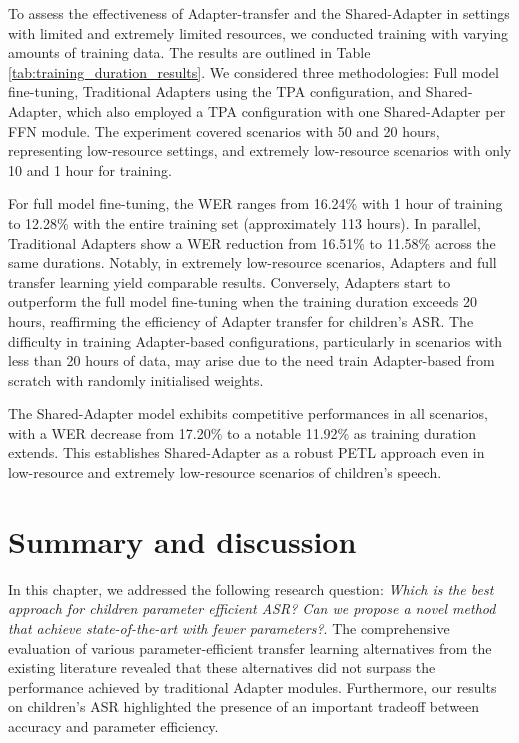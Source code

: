 To assess the effectiveness of Adapter-transfer and the Shared-Adapter in settings with limited and extremely limited resources, we conducted training with varying amounts of training data. The results are outlined in Table \ref{tab:training_duration_results}. We considered three methodologies: Full model fine-tuning, Traditional Adapters using the \ac{TPA} configuration, and Shared-Adapter, which also employed a \ac{TPA} configuration with one Shared-Adapter per \ac{FFN} module. The experiment covered scenarios with 50 and 20 hours, representing low-resource settings, and extremely low-resource scenarios with only 10 and 1 hour for training.

For full model fine-tuning, the \ac{WER} ranges from 16.24\% with 1 hour of training to 12.28\% with the entire training set (approximately 113 hours). In parallel, Traditional Adapters show a \ac{WER} reduction from 16.51\% to 11.58\% across the same durations. Notably, in extremely low-resource scenarios, Adapters and full transfer learning yield comparable results. Conversely, Adapters start to outperform the full model fine-tuning when the training duration exceeds 20 hours, reaffirming the efficiency of Adapter transfer for children's \ac{ASR}. The difficulty in training Adapter-based configurations, particularly in scenarios with less than 20 hours of data, may arise due to the need train Adapter-based from scratch with randomly initialised weights. 

The Shared-Adapter model exhibits competitive performances in all scenarios, with a \ac{WER} decrease from 17.20\% to a notable 11.92\% as training duration extends. This establishes Shared-Adapter as a robust \ac{PETL} approach even in low-resource and extremely low-resource scenarios of children's speech.

\section{Summary and discussion}
In this chapter, we addressed the following research question: \textit{Which is the best approach for children parameter efficient \ac{ASR}? Can we propose a novel method that achieve state-of-the-art with fewer parameters?}. The comprehensive evaluation of various parameter-efficient transfer learning alternatives from the existing literature revealed that these alternatives did not surpass the performance achieved by traditional Adapter modules. Furthermore, our results on children's \ac{ASR} highlighted the presence of an important tradeoff between accuracy and parameter efficiency.

